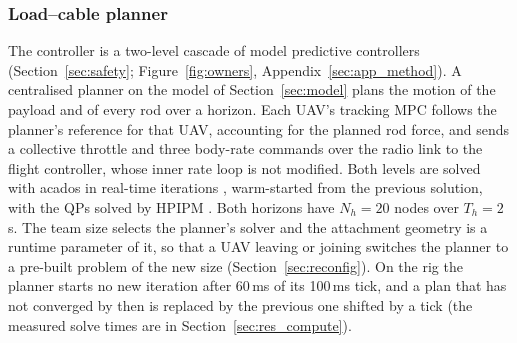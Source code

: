 
\subsubsection{Load--cable planner}
\label{sec:controller}

The controller is a two-level cascade of model predictive controllers (Section~\ref{sec:safety}; Figure~\ref{fig:owners}, Appendix~\ref{sec:app_method}).
A centralised planner on the model of Section~\ref{sec:model} plans the motion of the payload and of
every rod over a horizon. Each UAV's tracking MPC follows the planner's reference for that UAV,
accounting for the planned rod force, and sends a collective throttle and three body-rate commands
over the radio link to the flight controller, whose inner rate loop is not modified. Both levels are solved with acados
\cite{verschueren2022acados} in real-time iterations \cite{diehl2002rti}, warm-started from the previous solution,
with the QPs solved by HPIPM \cite{frison2020hpipm}.
Both horizons have $N_h = 20$ nodes over $T_h = 2$\,s. The team size selects the planner's solver and the
attachment geometry is a runtime parameter of it, so that a UAV leaving or joining switches the planner to a
pre-built problem of the new size (Section~\ref{sec:reconfig}). On the rig the planner starts no new iteration after 60\,ms of its
100\,ms tick, and a plan that has not converged by then is replaced by the previous one shifted by a tick (the measured
solve times are in Section~\ref{sec:res_compute}).

